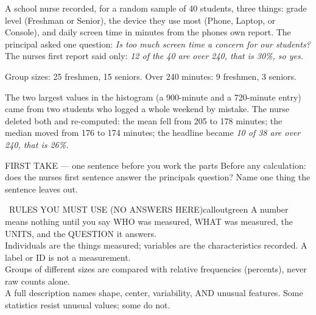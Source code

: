 \documentclass[11pt]{article}
\begin{document}
\clearpage
\normalsize
{}

A school nurse recorded, for a random sample of 40 students, three things: grade level (Freshman or Senior), the device they use most (Phone, Laptop, or Console), and daily screen time in minutes from the phone\textquotesingle s own report. The principal asked one question: \emph{Is too much screen time a concern for our students?} The nurse\textquotesingle s first report said only: \emph{12 of the 40 are over 240, that is 30\%, so yes.}\par\smallskip Group sizes: 25 freshmen, 15 seniors. Over 240 minutes: 9 freshmen, 3 seniors.\par\smallskip The two largest values in the histogram (a 900-minute and a 720-minute entry) came from two students who logged a whole weekend by mistake. The nurse deleted both and re-computed: the mean fell from 205 to 178 minutes; the median moved from 176 to 174 minutes; the headline became \emph{10 of 38 are over 240, that is 26\%.}\par
\begin{center}
\end{center}
\begin{firsttakebox}{FIRST TAKE --- one sentence before you work the parts}
Before any calculation: does the nurse\textquotesingle s first sentence answer the principal\textquotesingle s question? Name one thing the sentence leaves out.\par
{}
\end{firsttakebox}

\begin{callout}{\IconBook\ RULES YOU MUST USE (NO ANSWERS HERE)}{calloutgreen}
A number means nothing until you say WHO was measured, WHAT was measured, the UNITS, and the QUESTION it answers.\\ Individuals are the things measured; variables are the characteristics recorded. A label or ID is not a measurement.\\ Groups of different sizes are compared with relative frequencies (percents), never raw counts alone.\\ A full description names shape, center, variability, AND unusual features. Some statistics resist unusual values; some do not.
\end{callout}
\end{document}
